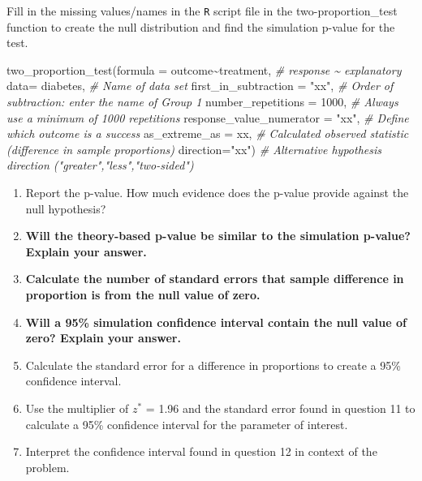 \documentclass[
]{report}
\newenvironment{Shaded}{\begin{snugshade}}{\end{snugshade}}
\newcommand{\AttributeTok}[1]{\textcolor[rgb]{0.77,0.63,0.00}{#1}}
\newcommand{\CommentTok}[1]{\textcolor[rgb]{0.56,0.35,0.01}{\textit{#1}}}
\newcommand{\DecValTok}[1]{\textcolor[rgb]{0.00,0.00,0.81}{#1}}
\newcommand{\FunctionTok}[1]{\textcolor[rgb]{0.00,0.00,0.00}{#1}}
\newcommand{\NormalTok}[1]{#1}
\newcommand{\SpecialCharTok}[1]{\textcolor[rgb]{0.00,0.00,0.00}{#1}}
\newcommand{\StringTok}[1]{\textcolor[rgb]{0.31,0.60,0.02}{#1}}
\begin{document}
Fill in the missing values/names in the \texttt{R} script file in the two-proportion\_test function to create the null distribution and find the simulation p-value for the test.

\begin{Shaded}
\begin{Highlighting}[]
\FunctionTok{two\_proportion\_test}\NormalTok{(}\AttributeTok{formula =}\NormalTok{ outcome}\SpecialCharTok{\textasciitilde{}}\NormalTok{treatment, }\CommentTok{\# response \textasciitilde{} explanatory}
                    \AttributeTok{data=}\NormalTok{ diabetes, }\CommentTok{\# Name of data set}
                    \AttributeTok{first\_in\_subtraction =} \StringTok{"xx"}\NormalTok{, }\CommentTok{\# Order of subtraction: enter the name of Group 1}
                    \AttributeTok{number\_repetitions =} \DecValTok{1000}\NormalTok{, }\CommentTok{\# Always use a minimum of 1000 repetitions}
                    \AttributeTok{response\_value\_numerator =} \StringTok{"xx"}\NormalTok{, }\CommentTok{\# Define which outcome is a success }
                    \AttributeTok{as\_extreme\_as =}\NormalTok{ xx, }\CommentTok{\# Calculated observed statistic (difference in sample proportions)}
                    \AttributeTok{direction=}\StringTok{"xx"}\NormalTok{) }\CommentTok{\# Alternative hypothesis direction ("greater","less","two{-}sided")}
\end{Highlighting}
\end{Shaded}

\begin{enumerate}
\def\labelenumi{\arabic{enumi}.}
\setcounter{enumi}{6}
\item
  Report the p-value. How much evidence does the p-value provide against the null hypothesis?
  \vspace{0.3in}
\item
  \textbf{Will the theory-based p-value be similar to the simulation p-value? Explain your answer.}
  \vspace{0.8in}
\item
  \textbf{Calculate the number of standard errors that sample difference in proportion is from the null value of zero.}
  \vspace{0.8in}
\item
  \textbf{Will a 95\% simulation confidence interval contain the null value of zero? Explain your answer.}
  \vspace{0.8in}
\item
  Calculate the standard error for a difference in proportions to create a 95\% confidence interval.\\
  \vspace{1in}
\item
  Use the multiplier of \(z^*\) = 1.96 and the standard error found in question 11 to calculate a 95\% confidence interval for the parameter of interest.
  \vspace{1in}
\item
  Interpret the confidence interval found in question 12 in context of the problem.
\end{enumerate}
\end{document}
